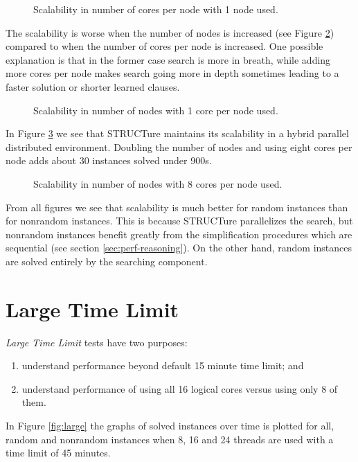 \begin{figure}
  \centering
  \caption{Scalability in number of cores per node with 1 node used.}
  \label{fig:para-1X}
\end{figure}

The scalability is worse when the number of nodes is increased
(see Figure \ref{fig:para-X1}) compared to when the number of
cores per node is increased. One possible explanation is that in
the former case search is more in breath, while adding more cores
per node makes search going more in depth sometimes leading to a
faster solution or shorter learned clauses.

\begin{figure}
  \centering
  \caption{Scalability in number of nodes with 1 core per node used.}
  \label{fig:para-X1}
\end{figure}

In Figure \ref{fig:para-X8} we see that STRUCTure maintains
its scalability in a hybrid parallel distributed environment.
Doubling the number of nodes and using eight cores per node adds
about 30 instances solved under 900s.

\begin{figure}
  \centering
  \caption{Scalability in number of nodes with 8 cores per node used.}
  \label{fig:para-X8}
\end{figure}

From all figures we see that scalability is much better for random
instances than for nonrandom instances. This is because STRUCTure
parallelizes the search, but nonrandom instances benefit greatly
from the simplification procedures which are sequential (see section
\ref{sec:perf-reasoning}). On the other hand, random instances are
solved entirely by the searching component.


\section{Large Time Limit}

\emph{Large Time Limit} tests have two purposes:
\begin{enumerate}
  \item understand performance beyond default 15 minute time limit; and
  \item understand performance of using all 16 logical cores versus
  using only 8 of them.
\end{enumerate}

In Figure \ref{fig:large} the graphs of solved instances over time is
plotted for all, random and nonrandom instances when 8, 16 and 24
threads are used with a time limit of 45 minutes.

